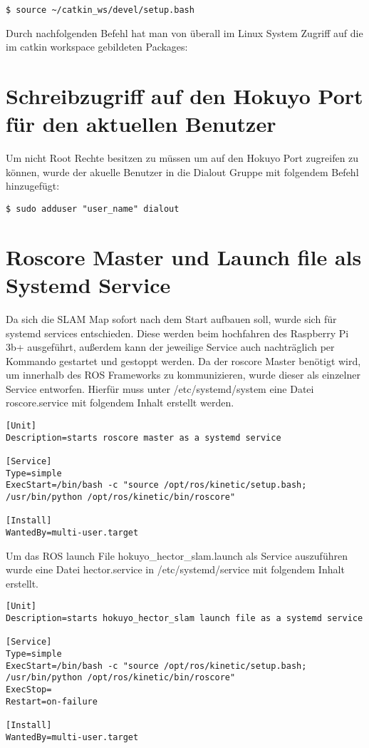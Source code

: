 \begin{lstlisting}
$ source ~/catkin_ws/devel/setup.bash
\end{lstlisting}

Durch nachfolgenden Befehl hat man von überall im Linux System Zugriff auf die im catkin workspace gebildeten Packages:\\ 


\section{Schreibzugriff auf den Hokuyo Port für den aktuellen Benutzer}
Um nicht Root Rechte besitzen zu müssen um auf den Hokuyo Port zugreifen zu können, wurde der akuelle Benutzer in die Dialout Gruppe mit folgendem Befehl hinzugefügt:\\

\begin{lstlisting}
$ sudo adduser "user_name" dialout
\end{lstlisting}

\section{Roscore Master und Launch file als Systemd Service}
Da sich die SLAM Map sofort nach dem Start aufbauen soll, wurde sich für systemd services entschieden. Diese werden beim hochfahren des Raspberry Pi 3b+ ausgeführt, außerdem kann der jeweilige Service auch nachträglich per Kommando gestartet und gestoppt werden. 
Da der roscore Master benötigt wird, um innerhalb des ROS Frameworks zu kommunizieren, wurde dieser als einzelner Service entworfen. Hierfür muss unter /etc/systemd/system eine Datei roscore.service mit folgendem Inhalt erstellt werden. 


\begin{lstlisting}
[Unit]
Description=starts roscore master as a systemd service

[Service]
Type=simple
ExecStart=/bin/bash -c "source /opt/ros/kinetic/setup.bash; /usr/bin/python /opt/ros/kinetic/bin/roscore"

[Install]
WantedBy=multi-user.target
\end{lstlisting}

Um das ROS launch File hokuyo\_hector\_slam.launch als Service auszuführen wurde eine Datei hector.service in /etc/systemd/service mit folgendem Inhalt erstellt. 

\begin{lstlisting}
[Unit]
Description=starts hokuyo_hector_slam launch file as a systemd service

[Service]
Type=simple
ExecStart=/bin/bash -c "source /opt/ros/kinetic/setup.bash; /usr/bin/python /opt/ros/kinetic/bin/roscore"
ExecStop=
Restart=on-failure

[Install]
WantedBy=multi-user.target
\end{lstlisting}

